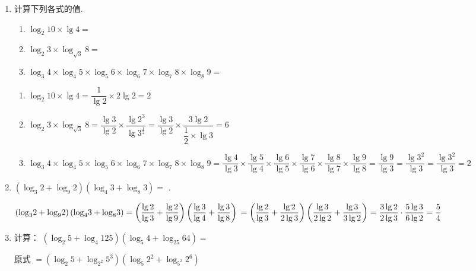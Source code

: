 \begin{enumerate}
    \item 计算下列各式的值.
    \begin{enumerate}
        \item ${\log }_{2}{10} \times  \lg 4 =$ 
        \item ${\log }_{2}3 \times  {\log }_{\sqrt{3}}8 =$ 
        \item ${\log }_{3}4 \times  {\log }_{4}5 \times  {\log }_{5}6 \times  {\log }_{6}7 \times  {\log }_{7}8 \times  {\log }_{8}9 =$ 
    \end{enumerate}
    \begin{jieda}
        \begin{enumerate}
            \item ${\log }_{2}{10} \times  \lg 4 = \dfrac{1}{\lg 2} \times  2\lg 2 = 2$
            \item ${\log }_{2}3 \times  {\log }_{\sqrt{3}}8 = \dfrac{\lg 3}{\lg 2} \times  \dfrac{\lg {2}^{3}}{\lg {3}^{\frac{1}{2}}} = \dfrac{\lg 3}{\lg 2} \times  \dfrac{3\lg 2}{\dfrac{1}{2} \times  \lg 3} = 6$
            \item ${\log }_{3}4 \times  {\log }_{4}5 \times  {\log }_{5}6 \times  {\log }_{6}7 \times  {\log }_{7}8 \times  {\log }_{8}9 = \dfrac{\lg 4}{\lg 3} \times  \dfrac{\lg 5}{\lg 4} \times  \dfrac{\lg 6}{\lg 5} \times  \dfrac{\lg 7}{\lg 6} \times  \dfrac{\lg 8}{\lg 7} \times  \dfrac{\lg 9}{\lg 8} = \dfrac{\lg 9}{\lg 3} = \dfrac{\lg {3}^{2}}{\lg 3} = \dfrac{\lg {3}^{2}}{\lg 3} = 2$
        \end{enumerate}
    \end{jieda}
    \item $\left( {{\log }_{3}2 + {\log }_{9}2}\right) \left( {{\log }_{4}3 + {\log }_{8}3}\right)  =$ .
    \begin{jieda}
        $\left( {{\log }_{3}2 + {\log }_{9}2}\right) \left( {{\log }_{4}3 + {\log }_{8}3}\right)  = \left( {\dfrac{\lg 2}{\lg 3} + \dfrac{\lg 2}{\lg 9}}\right) \left( {\dfrac{\lg 3}{\lg 4} + \dfrac{\lg 3}{\lg 8}}\right)  \\
        = \left( {\dfrac{\lg 2}{\lg 3} + \dfrac{\lg 2}{2\lg 3}}\right) \left( {\dfrac{\lg 3}{2\lg 2} + \dfrac{\lg 3}{3\lg 2}}\right) = \dfrac{3\lg 2}{2\lg 3} \cdot  \dfrac{5\lg 3}{6\lg 2} = \dfrac{5}{4}$
    \end{jieda}
    
    \item 计算： $\left( {{\log }_{2}5 + {\log }_{4}{125}}\right) \left( {{\log }_{5}4 + {\log }_{25}{64}}\right) = $
    \begin{jieda}
        原式 $= \left( {{\log }_{2}5 + {\log }_{{2}^{2}}{5}^{3}}\right) \left( {{\log }_{5}{2}^{2} + {\log }_{5^2}{2}^{6}}\right)$


\end{jieda}
\end{enumerate}
